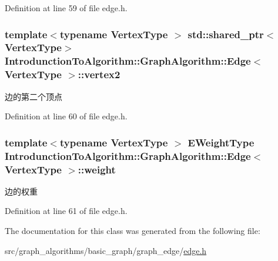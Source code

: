 Definition at line 59 of file edge.\+h.

\hypertarget{class_introdunction_to_algorithm_1_1_graph_algorithm_1_1_edge_a8f472842aacb0079c66bc7b98fbc6351}{}
\subsubsection[{vertex2}]{\setlength{\rightskip}{0pt plus 5cm}template$<$typename Vertex\+Type $>$ std\+::shared\+\_\+ptr$<$Vertex\+Type$>$ {\bf Introdunction\+To\+Algorithm\+::\+Graph\+Algorithm\+::\+Edge}$<$ Vertex\+Type $>$\+::vertex2}\label{class_introdunction_to_algorithm_1_1_graph_algorithm_1_1_edge_a8f472842aacb0079c66bc7b98fbc6351}
边的第二个顶点 

Definition at line 60 of file edge.\+h.

\hypertarget{class_introdunction_to_algorithm_1_1_graph_algorithm_1_1_edge_a0ce18b9faeda82aabc5293e5ceb3924f}{}
\subsubsection[{weight}]{\setlength{\rightskip}{0pt plus 5cm}template$<$typename Vertex\+Type $>$ {\bf E\+Weight\+Type} {\bf Introdunction\+To\+Algorithm\+::\+Graph\+Algorithm\+::\+Edge}$<$ Vertex\+Type $>$\+::weight}\label{class_introdunction_to_algorithm_1_1_graph_algorithm_1_1_edge_a0ce18b9faeda82aabc5293e5ceb3924f}
边的权重 

Definition at line 61 of file edge.\+h.



The documentation for this class was generated from the following file\+:\begin{DoxyCompactItemize}
\item 
src/graph\+\_\+algorithms/basic\+\_\+graph/graph\+\_\+edge/\hyperlink{edge_8h}{edge.\+h}\end{DoxyCompactItemize}
